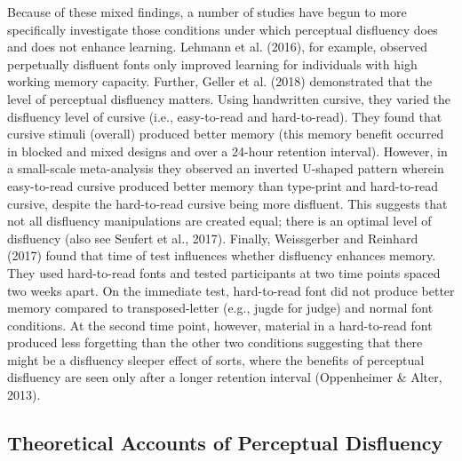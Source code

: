 \documentclass[
  english,
  jou]{apa7}
\begin{document}
Because of these mixed findings, a number of studies have begun to more specifically investigate those conditions under which perceptual disfluency does and does not enhance learning. Lehmann et al. (2016), for example, observed perpetually disfluent fonts only improved learning for individuals with high working memory capacity. Further, Geller et al. (2018) demonstrated that the level of perceptual disfluency matters. Using handwritten cursive, they varied the disfluency level of cursive (i.e., easy-to-read and hard-to-read). They found that cursive stimuli (overall) produced better memory (this memory benefit occurred in blocked and mixed designs and over a 24-hour retention interval). However, in a small-scale meta-analysis they observed an inverted U-shaped pattern wherein easy-to-read cursive produced better memory than type-print and hard-to-read cursive, despite the hard-to-read cursive being more disfluent. This suggests that not all disfluency manipulations are created equal; there is an optimal level of disfluency (also see Seufert et al., 2017). Finally, Weissgerber and Reinhard (2017) found that time of test influences whether disfluency enhances memory. They used hard-to-read fonts and tested participants at two time points spaced two weeks apart. On the immediate test, hard-to-read font did not produce better memory compared to transposed-letter (e.g., jugde for judge) and normal font conditions. At the second time point, however, material in a hard-to-read font produced less forgetting than the other two conditions suggesting that there might be a disfluency sleeper effect of sorts, where the benefits of perceptual disfluency are seen only after a longer retention interval (Oppenheimer \& Alter, 2013).

\hypertarget{theoretical-accounts-of-perceptual-disfluency}{%
\subsection{Theoretical Accounts of Perceptual Disfluency}\label{theoretical-accounts-of-perceptual-disfluency}}
\end{document}
